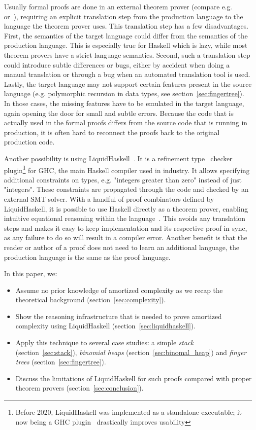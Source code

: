 \documentclass[sigplan,screen,review,anonymous]{acmart}
\begin{document}
Usually formal proofs are done in an external theorem prover (compare e.g.~\cite{complexity_coq} or~\cite{complexity_isabelle}), requiring an explicit translation step from the production language to the language the theorem prover uses. This translation step has a few disadvantages. First, the semantics of the target language could differ from the semantics of the production language. This is especially true for Haskell which is lazy, while most theorem provers have a strict language semantics. Second, such a translation step could introduce subtle differences or bugs, either by accident when doing a manual translation or through a bug when an automated translation tool is used. Lastly, the target language may not support certain features present in the source language (e.g. polymorphic recursion in data types, see section~\ref{sec:fingertree}). In those cases, the missing features have to be emulated in the target language, again opening the door for small and subtle errors. Because the code that is actually used in the formal proofs differs from the source code that is running in production, it is often hard to reconnect the proofs back to the original production code.

Another possibility is using LiquidHaskell~\cite{liquidhaskell}. It is a refinement type~\cite{refinement_types} checker plugin\footnote{Before 2020, LiquidHaskell was implemented as a standalone executable; it now being a GHC plugin~\cite{lh_plugin} drastically improves usability} for GHC, the main Haskell compiler used in industry. It allows specifying additional constraints on types, e.g. "integers greater than zero" instead of just "integers". These constraints are propagated through the code and checked by an external SMT solver. With a handful of proof combinators defined by LiquidHaskell, it is possible to use Haskell directly as a theorem prover, enabling intuitive equational reasoning within the language~\cite{tpfa}. This avoids any translation steps and makes it easy to keep implementation and its respective proof in sync, as any failure to do so will result in a compiler error. Another benefit is that the reader or author of a proof does not need to learn an additional language, the production language is the same as the proof language.

In this paper, we:
\begin{itemize}
\item{Assume no prior knowledge of amortized complexity as we recap the theoretical background (section~\ref{sec:complexity}).}
\item{Show the reasoning infrastructure that is needed to prove amortized complexity using LiquidHaskell (section~\ref{sec:liquidhaskell}).}
\item{Apply this technique to several case studies: a simple \textit{stack} (section~\ref{sec:stack}), \textit{binomial heaps} (section~\ref{sec:binomal_heap}) and \textit{finger trees} (section~\ref{sec:fingertree}).}
\item{Discuss the limitations of LiquidHaskell for such proofs compared with proper theorem provers (section~\ref{sec:conclusion}).}
\end{itemize}
\end{document}
